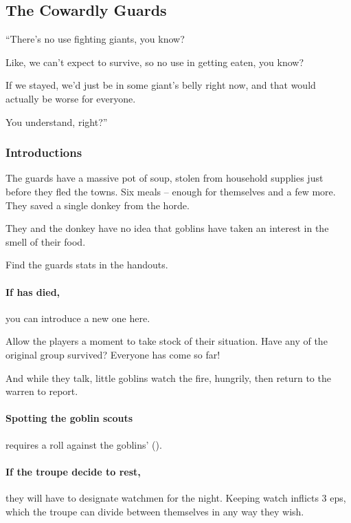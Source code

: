 \begin{multicols}{2}
\subsection{The Cowardly Guards}

\begin{speechtext}
  ``There's no use fighting giants, you know?

  Like, we can't expect to survive, so no use in getting eaten, you know?

  If we stayed, we'd just be in some giant's belly right now, and that would actually be worse for everyone.

  You understand, right?''
\end{speechtext}

\subsubsection{Introductions}

The \glspl{guard} have a massive pot of soup, stolen from household supplies just before they fled the towns.
Six meals -- enough for themselves and a few more.
They saved a single donkey from the horde.


They and the donkey have no idea that goblins have taken an interest in the smell of their food.

Find the \glspl{guard} stats in the handouts.

\paragraph{If  has died,}
you can introduce a new one here.

Allow the players a moment to take stock of their situation.
Have any of the original group survived?
Everyone has come so far!

And while they talk, little goblins watch the fire, hungrily, then return to the warren to report.


\paragraph{Spotting the goblin scouts}
requires a  roll against the goblins'  (\tn).

\paragraph{If the troupe decide to rest,}
they will have to designate watchmen for the night.
Keeping watch inflicts 3 \glspl{ep}, which the troupe can divide between themselves in any way they wish.


\end{multicols}
